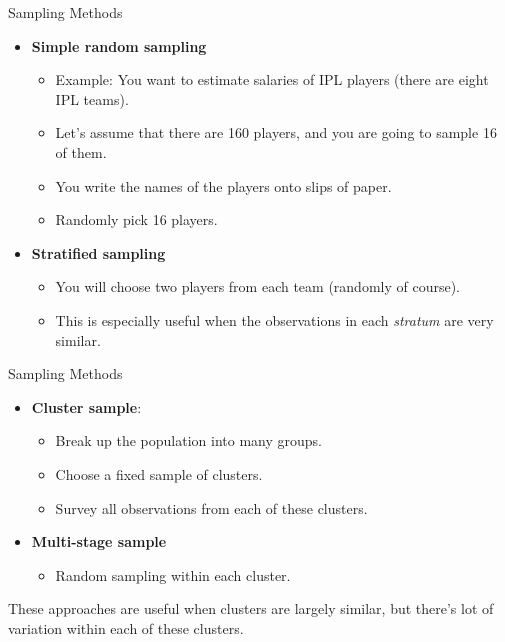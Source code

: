 \documentclass[notes,11pt, aspectratio=169]{beamer}
\begin{document}
\begin{frame}{Sampling Methods}

\begin{itemize}
\item \textbf{Simple random sampling}
     \begin{itemize} 
      \item Example: You want to estimate salaries of IPL players (there are eight IPL teams).
      \item Let's assume that there are 160 players, and you are going to sample 16 of them.
      \item You write the names of the players onto slips of paper.
      \item Randomly pick 16 players.
      \end{itemize}

\pause
\item \textbf{Stratified sampling}
     \begin{itemize}
     \item You will choose two players from each team (randomly of course).
     \item This is especially useful when the observations in each \textit{stratum} are very similar.
     \end{itemize}
\end{itemize}
\end{frame}

\begin{frame}{Sampling Methods}

\begin{itemize}

\item \textbf{Cluster sample}:
       \begin{itemize}
       \item Break up the population into many groups.
       \item Choose a fixed sample of clusters.
       \item Survey all observations from each of these clusters.
       \end{itemize}

\pause
\item \textbf{Multi-stage sample}
      \begin{itemize}
      \item Random sampling within each cluster.
      \end{itemize}
\end{itemize}

These approaches are useful when clusters are largely similar, but there's lot of variation within each of these clusters.

\end{frame}
\end{document}
